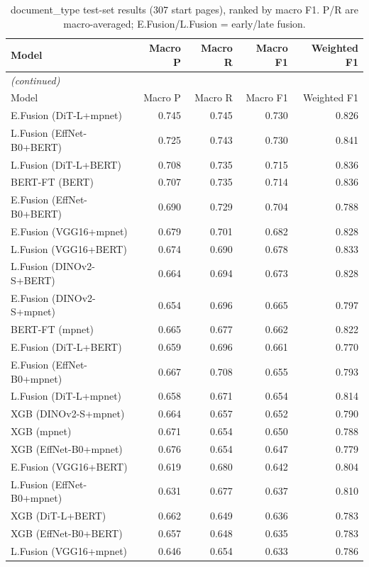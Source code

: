 \begin{longtable}{lrrrr}
\caption{document\_type test-set results (307 start pages), ranked by macro F1. P/R are macro-averaged; E.Fusion/L.Fusion = early/late fusion.} \label{tab:results-doc-type} \\
\toprule
Model & Macro P & Macro R & Macro F1 & Weighted F1 \\
\midrule
\endfirsthead
\multicolumn{5}{l}{\small\itshape (continued)} \\
\toprule
Model & Macro P & Macro R & Macro F1 & Weighted F1 \\
\midrule
\endhead
\bottomrule
\endfoot
E.Fusion (DiT-L+mpnet) & 0.745 & 0.745 & 0.730 & 0.826 \\
L.Fusion (EffNet-B0+BERT) & 0.725 & 0.743 & 0.730 & 0.841 \\
L.Fusion (DiT-L+BERT) & 0.708 & 0.735 & 0.715 & 0.836 \\
BERT-FT (BERT) & 0.707 & 0.735 & 0.714 & 0.836 \\
E.Fusion (EffNet-B0+BERT) & 0.690 & 0.729 & 0.704 & 0.788 \\
E.Fusion (VGG16+mpnet) & 0.679 & 0.701 & 0.682 & 0.828 \\
L.Fusion (VGG16+BERT) & 0.674 & 0.690 & 0.678 & 0.833 \\
L.Fusion (DINOv2-S+BERT) & 0.664 & 0.694 & 0.673 & 0.828 \\
E.Fusion (DINOv2-S+mpnet) & 0.654 & 0.696 & 0.665 & 0.797 \\
BERT-FT (mpnet) & 0.665 & 0.677 & 0.662 & 0.822 \\
E.Fusion (DiT-L+BERT) & 0.659 & 0.696 & 0.661 & 0.770 \\
E.Fusion (EffNet-B0+mpnet) & 0.667 & 0.708 & 0.655 & 0.793 \\
L.Fusion (DiT-L+mpnet) & 0.658 & 0.671 & 0.654 & 0.814 \\
XGB (DINOv2-S+mpnet) & 0.664 & 0.657 & 0.652 & 0.790 \\
XGB (mpnet) & 0.671 & 0.654 & 0.650 & 0.788 \\
XGB (EffNet-B0+mpnet) & 0.676 & 0.654 & 0.647 & 0.779 \\
E.Fusion (VGG16+BERT) & 0.619 & 0.680 & 0.642 & 0.804 \\
L.Fusion (EffNet-B0+mpnet) & 0.631 & 0.677 & 0.637 & 0.810 \\
XGB (DiT-L+BERT) & 0.662 & 0.649 & 0.636 & 0.783 \\
XGB (EffNet-B0+BERT) & 0.657 & 0.648 & 0.635 & 0.783 \\
L.Fusion (VGG16+mpnet) & 0.646 & 0.654 & 0.633 & 0.786 \\

\end{longtable}
